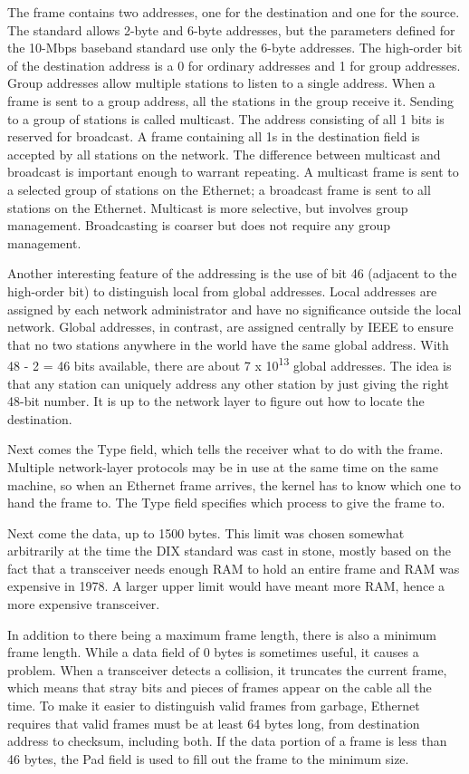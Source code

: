\documentclass[b5paper,11pt]{memoir}
\begin{document}
The frame contains two addresses, one for the destination and one for
the source. The standard allows 2-byte and 6-byte addresses, but the
parameters defined for the 10-Mbps baseband standard use only the 6-byte
addresses. The high-order bit of the destination address is a 0 for
ordinary addresses and 1 for group addresses. Group addresses allow
multiple stations to listen to a single address. When a frame is sent to
a group address, all the stations in the group receive it. Sending to a
group of stations is called {multicast}. The address consisting of all 1
bits is reserved for {broadcast}. A frame containing all 1s in the
destination field is accepted by all stations on the network. The
difference between multicast and broadcast is important enough to
warrant repeating. A multicast frame is sent to a selected group of
stations on the Ethernet; a broadcast frame is sent to all stations on
the Ethernet. Multicast is more selective, but involves group
management. Broadcasting is coarser but does not require any group
management.

Another interesting feature of the addressing is the use of bit 46
(adjacent to the high-order bit) to distinguish local from global
addresses. Local addresses are assigned by each network administrator
and have no significance outside the local network. Global addresses, in
contrast, are assigned centrally by IEEE to ensure that no two stations
anywhere in the world have the same global address. With 48 - 2 = 46
bits available, there are about 7 x 10\textsuperscript{13} global
addresses. The idea is that any station can uniquely address any other
station by just giving the right 48-bit number. It is up to the network
layer to figure out how to locate the destination.

Next comes the {Type} field, which tells the receiver what to do with
the frame. Multiple network-layer protocols may be in use at the same
time on the same machine, so when an Ethernet frame arrives, the kernel
has to know which one to hand the frame to. The {Type} field specifies
which process to give the frame to.

Next come the data, up to 1500 bytes. This limit was chosen somewhat
arbitrarily at the time the DIX standard was cast in stone, mostly based
on the fact that a transceiver needs enough RAM to hold an entire frame
and RAM was expensive in 1978. A larger upper limit would have meant
more RAM, hence a more expensive transceiver.

In addition to there being a maximum frame length, there is also a
minimum frame length. While a data field of 0 bytes is sometimes useful,
it causes a problem. When a transceiver detects a collision, it
truncates the current frame, which means that stray bits and pieces of
frames appear on the cable all the time. To make it easier to
distinguish valid frames from garbage, Ethernet requires that valid
frames must be at least 64 bytes long, from destination address to
checksum, including both. If the data portion of a frame is less than 46
bytes, the {Pad} field is used to fill out the frame to the minimum
size.
\end{document}
